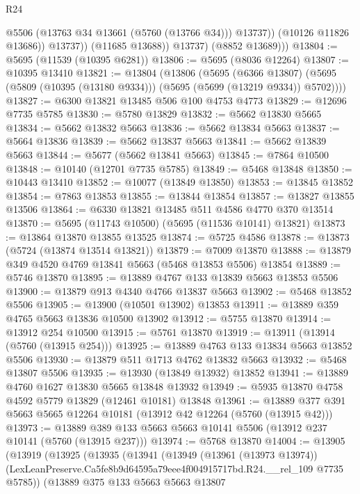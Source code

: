 \begin{lexlean}{R24}
\begin{coremodule}
                      @5506
                      (@13763 @34 @13661 (@5760 (@13766 @34)))
                      @13737))
                  (@10126 @11826 @13686))
                @13737))
            (@11685 @13688))
          @13737)
        (@8852 @13689)))
@13804 := @5695 (@11539 (@10395 @6281))
@13806 := @5695 (@8036 @12264)
@13807 := @10395 @13410
@13821 := @13804
    (@13806
      (@5695
        (@6366 @13807)
        (@5695 (@5809 (@10395 (@13180 @9334))) (@5695 (@5699 (@13219 @9334)) @5702))))
@13827 := @6300 @13821 @13485 @506 @100 @4753 @4773
@13829 := @12696 @7735 @5785
@13830 := @5780 @13829
@13832 := @5662 @13830 @5665
@13834 := @5662 @13832 @5663
@13836 := @5662 @13834 @5663
@13837 := @5664 @13836
@13839 := @5662 @13837 @5663
@13841 := @5662 @13839 @5663
@13844 := @5677 (@5662 @13841 @5663)
@13845 := @7864 @10500
@13848 := @10140 (@12701 @7735 @5785)
@13849 := @5468 @13848
@13850 := @10443 @13410
@13852 := @10077 (@13849 @13850)
@13853 := @13845 @13852
@13854 := @7863 @13853
@13855 := @13844 @13854
@13857 := @13827 @13855 @13506
@13864 := @6330 @13821 @13485 @511 @4586 @4770 @370 @13514
@13870 := @5695 (@11743 @10500) (@5695 (@11536 @10141) @13821)
@13873 := @13864 @13870 @13855 @13525
@13874 := @5725 @4586
@13878 := @13873 (@5724 (@13874 @13514 @13821))
@13879 := @7009 @13870
@13888 := @13879 @349 @4520 @4769 @13841 @5663 (@5468 @13853 @5506) @13854
@13889 := @5746 @13870
@13895 := @13889 @4767 @133 @13839 @5663 @13853 @5506
@13900 := @13879 @913 @4340 @4766 @13837 @5663
@13902 := @5468 @13852 @5506
@13905 := @13900 (@10501 @13902) @13853
@13911 := @13889 @359 @4765 @5663 @13836 @10500 @13902
@13912 := @5755 @13870
@13914 := @13912 @254 @10500
@13915 := @5761 @13870
@13919 := @13911 (@13914 (@5760 (@13915 @254)))
@13925 := @13889 @4763 @133 @13834 @5663 @13852 @5506
@13930 := @13879 @511 @1713 @4762 @13832 @5663
@13932 := @5468 @13807 @5506
@13935 := @13930 (@13849 @13932) @13852
@13941 := @13889 @4760 @1627 @13830 @5665 @13848 @13932
@13949 := @5935 @13870 @4758 @4592 @5779 @13829 (@12461 @10181) @13848
@13961 := @13889 @377 @391 @5663 @5665 @12264 @10181 (@13912 @42 @12264 (@5760 (@13915 @42)))
@13973 := @13889 @389 @133 @5663 @5663 @10141 @5506 (@13912 @237 @10141 (@5760 (@13915 @237)))
@13974 := @5768 @13870
@14004 := @13905
    (@13919
      (@13925
        (@13935
          (@13941
            (@13949
              (@13961 (@13973 @13974))
              (LexLeanPreserve.Ca5fe8b9d64595a79eee4f004915717bd.R24.__rel_109 @7735 @5785))
            (@13889
              @375
              @133
              @5663
              @5663
              @13807

\end{coremodule}
\end{lexlean}
